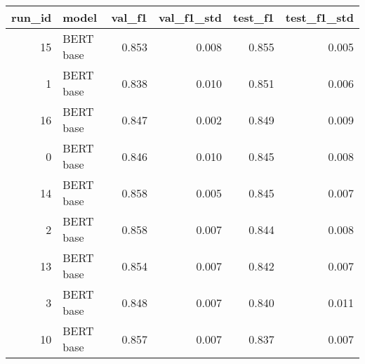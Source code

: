 \begin{tabular}{rlrrrr}
\toprule
 run\_id &     model &  val\_f1 &  val\_f1\_std &  test\_f1 &  test\_f1\_std \\
\midrule
     15 & BERT base &   0.853 &       0.008 &    0.855 &        0.005 \\
      1 & BERT base &   0.838 &       0.010 &    0.851 &        0.006 \\
     16 & BERT base &   0.847 &       0.002 &    0.849 &        0.009 \\
      0 & BERT base &   0.846 &       0.010 &    0.845 &        0.008 \\
     14 & BERT base &   0.858 &       0.005 &    0.845 &        0.007 \\
      2 & BERT base &   0.858 &       0.007 &    0.844 &        0.008 \\
     13 & BERT base &   0.854 &       0.007 &    0.842 &        0.007 \\
      3 & BERT base &   0.848 &       0.007 &    0.840 &        0.011 \\
     10 & BERT base &   0.857 &       0.007 &    0.837 &        0.007 \\
\bottomrule
\end{tabular}
